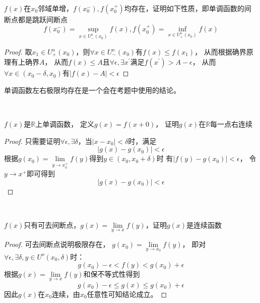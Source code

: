 ~

\begin{exercise}[单调函数的间断点]
  $f(x)$在$x_0$邻域单增，$f(x_0^-),f(x_0^+)$均存在，证明如下性质，即单调函数的间断点都是跳跃间断点
  \begin{equation*}
    f(x_0^-) = \sup \limits _{x \in U_-^o(x_0)}f(x), f(x_0^+) = \inf \limits _{x \in U_+^o(x_0)}f(x)
  \end{equation*}
\end{exercise}

\begin{proof}
  取$x_1 \in U_+^o(x_0)$，则$\forall x \in U_-^o(x_0)$有$f(x) \leq f(x_1)$，
  从而根据确界原理有上确界$A$，
  从而$f(x) \leq A$且$\forall \epsilon, \exists x^{\prime}$满足$f(x^{\prime}) > A - \epsilon$，
  从而$\forall x \in (x_0 - \delta, x_0)$有$|f(x) - A| < \epsilon$
\end{proof}

\begin{note}
  单调函数左右极限均存在是一个会在考题中使用的结论。
\end{note}


~

\begin{exercise}[单调函数右连续]
  $f(x)$是$\mathbb{R}$上单调函数，
  定义$g(x) = f(x + 0)$，
  证明$g(x)$在$\mathbb{R}$每一点右连续
\end{exercise}

\begin{proof}
  只需要证明$\forall \epsilon, \exists \delta$，当$|x - x_0| < \delta$时，满足
  \begin{equation*}
    |g(x) - g(x_0)| < \epsilon
  \end{equation*}
  根据$g(x_0) = \lim \limits _{y \rightarrow x_0^+}f(y)$得到$y \in (x_0,x_0 + \delta)$时
  有$|f(y) - g(x_0)| < \epsilon$，
  令$y \rightarrow x^+$即可得到
  \begin{equation*}
    |g(x) - g(x_0)| < \epsilon
  \end{equation*}
\end{proof}


~

\begin{exercise}[极限的连续性]
  $f(x)$只有可去间断点，$g(x) = \lim \limits _{y \rightarrow x}f(y)$，证明$g(x)$是连续函数
\end{exercise}

\begin{proof}
  可去间断点说明极限存在，
  $g(x_0) = \lim \limits _{y \rightarrow x_0}f(y)$，
  即对$\forall \epsilon, \exists \delta, y \in U^o(x_0,\delta)$时：
  \begin{equation*}
    g(x_0) - \epsilon < f(y) < g(x_0) + \epsilon
  \end{equation*}
  根据$g(x) = \lim \limits _{y \rightarrow x}f(y)$和保不等式性得到
  \begin{equation*}
    g(x_0) - \epsilon \leq g(x) \leq g(x_0) + \epsilon
  \end{equation*}
  因此$g(x)$在$x_0$连续，由$x_0$任意性可知结论成立。
\end{proof}

